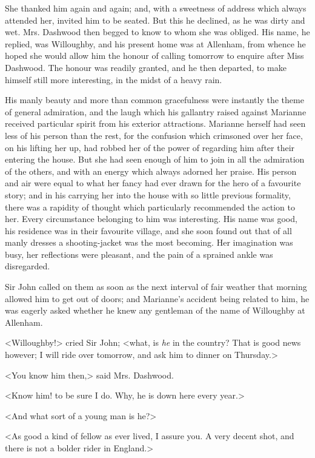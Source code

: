 She thanked him again and again; and, with a sweetness of address which always attended her, invited him to be seated. But this he declined, as he was dirty and wet. Mrs. Dashwood then begged to know to whom she was obliged. His name, he replied, was Willoughby, and his present home was at Allenham, from whence he hoped she would allow him the honour of calling tomorrow to enquire after Miss Dashwood. The honour was readily granted, and he then departed, to make himself still more interesting, in the midst of a heavy rain.

His manly beauty and more than common gracefulness were instantly the theme of general admiration, and the laugh which his gallantry raised against Marianne received particular spirit from his exterior attractions. Marianne herself had seen less of his person than the rest, for the confusion which crimsoned over her face, on his lifting her up, had robbed her of the power of regarding him after their entering the house. But she had seen enough of him to join in all the admiration of the others, and with an energy which always adorned her praise. His person and air were equal to what her fancy had ever drawn for the hero of a favourite story; and in his carrying her into the house with so little previous formality, there was a rapidity of thought which particularly recommended the action to her. Every circumstance belonging to him was interesting. His name was good, his residence was in their favourite village, and she soon found out that of all manly dresses a shooting-jacket was the most becoming. Her imagination was busy, her reflections were pleasant, and the pain of a sprained ankle was disregarded.

Sir John called on them as soon as the next interval of fair weather that morning allowed him to get out of doors; and Marianne's accident being related to him, he was eagerly asked whether he knew any gentleman of the name of Willoughby at Allenham.

<Willoughby!> cried Sir John; <what, is \textit{he} in the country? That is good news however; I will ride over tomorrow, and ask him to dinner on Thursday.>

<You know him then,> said Mrs. Dashwood.

<Know him! to be sure I do. Why, he is down here every year.>

<And what sort of a young man is he?>

<As good a kind of fellow as ever lived, I assure you. A very decent shot, and there is not a bolder rider in England.>

